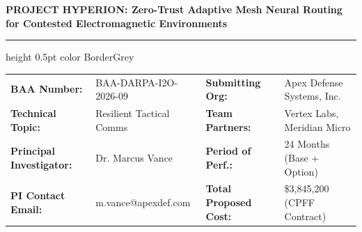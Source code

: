 \documentclass[10pt,a4paper]{article}
\begin{document}
\begin{tcolorbox}[proposalbox, title={\Large\faShield* \ \ DARPA TECHNICAL \& COST PROPOSAL}]
\vspace{1pt}
{\Large\bfseries\color{NavyPrimary} PROJECT HYPERION: Zero-Trust Adaptive Mesh Neural Routing for Contested Electromagnetic Environments}

\vspace{4pt}
\hrule height 0.5pt color BorderGrey
\vspace{4pt}

\small
\begin{tabularx}{\linewidth}{@{}l X l X@{}}
\textbf{BAA Number:} & BAA-DARPA-I2O-2026-09 & \textbf{Submitting Org:} & Apex Defense Systems, Inc. \\
\textbf{Technical Topic:} & Resilient Tactical Comms & \textbf{Team Partners:} & Vertex Labs, Meridian Micro \\
\textbf{Principal Investigator:} & Dr. Marcus Vance & \textbf{Period of Perf.:} & 24 Months (Base + Option) \\
\textbf{PI Contact Email:} & m.vance@apexdef.com & \textbf{Total Proposed Cost:} & \$3,845,200 (CPFF Contract) \\
\end{tabularx}
\end{tcolorbox}

\vspace{4pt}
\end{document}
